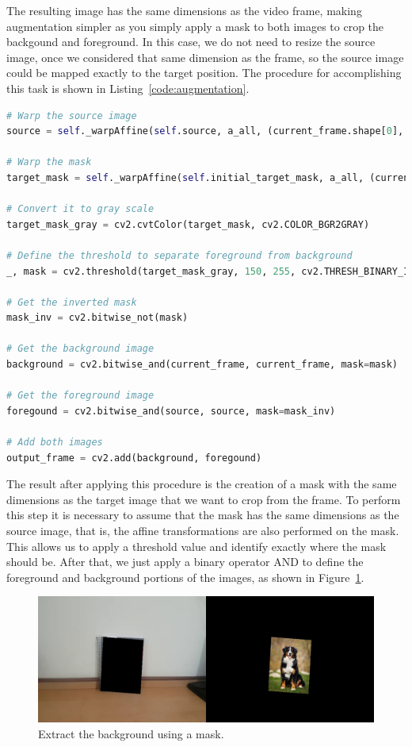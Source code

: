 \documentclass[]{IEEEtran}
\begin{document}
The resulting image has the same dimensions as the video frame, making augmentation simpler as you simply apply a mask to both images to crop the backgound and foreground. In this case, we do not need to resize the source image, once we considered that same dimension as the frame, so the source image could be mapped exactly to the target position. The procedure for accomplishing this task is shown in Listing~\ref{code:augmentation}.

\begin{lstlisting}[language=Python, caption={Augmentation algorithm}, label={code:augmentation}]
# Warp the source image
source = self._warpAffine(self.source, a_all, (current_frame.shape[0], current_frame.shape[1]))

# Warp the mask
target_mask = self._warpAffine(self.initial_target_mask, a_all, (current_frame.shape[0], current_frame.shape[1]))

# Convert it to gray scale
target_mask_gray = cv2.cvtColor(target_mask, cv2.COLOR_BGR2GRAY)

# Define the threshold to separate foreground from background
_, mask = cv2.threshold(target_mask_gray, 150, 255, cv2.THRESH_BINARY_INV)

# Get the inverted mask
mask_inv = cv2.bitwise_not(mask)

# Get the background image
background = cv2.bitwise_and(current_frame, current_frame, mask=mask)

# Get the foreground image
foregound = cv2.bitwise_and(source, source, mask=mask_inv)

# Add both images
output_frame = cv2.add(background, foregound)
\end{lstlisting}


The result after applying this procedure is the creation of a mask with the same dimensions as the target image that we want to crop from the frame. To perform this step it is necessary to assume that the mask has the same dimensions as the source image, that is, the affine transformations are also performed on the mask. This allows us to apply a threshold value and identify exactly where the mask should be. After that, we just apply a binary operator AND to define the foreground and background portions of the images, as shown in Figure~\ref{fig:paste_1}.

\begin{figure}[H]
     \centering
     \includegraphics[width=0.9\hsize]{img/paste_1.jpg}
      \caption{Extract the background using a mask.}
     \label{fig:paste_1}
\end{figure}
\end{document}
